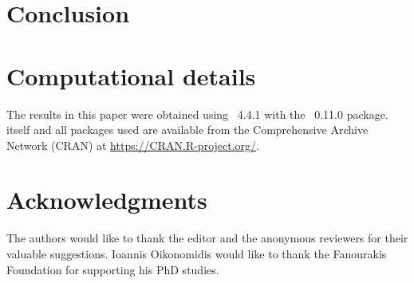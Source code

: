 \documentclass[nojss]{jss}
\begin{document}
\section[Conclusion]{Conclusion}

\section*{Computational details}

The results in this paper were obtained using
~4.4.1 with the
~0.11.0 package.  itself
and all packages used are available from the Comprehensive
 Archive Network (CRAN) at
\url{https://CRAN.R-project.org/}.

\section*{Acknowledgments}

\begin{leftbar}
The authors would like to thank the editor and the anonymous reviewers for their valuable suggestions. Ioannis Oikonomidis would like to thank the Fanourakis Foundation for supporting his PhD studies.
\end{leftbar}



\end{document}
